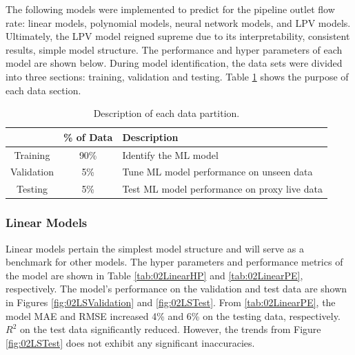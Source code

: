 The following models were implemented to predict for the pipeline outlet flow rate: linear models, polynomial models, neural network models, and LPV models.  Ultimately, the LPV model reigned supreme due to its interpretability, consistent results, simple model structure. The performance and hyper parameters of each model are shown below.  During model identification, the data sets were divided into three sections: training, validation and testing.  Table \ref{tab:02datapart} shows the purpose of each data section.
\begin{table}[h]
    \centering
    {
    \begin{tabular}{ c | c | p{9cm}}
                            & \% of Data        &  Description \\
        \hline
        Training            &  90\%             
        &  Identify the ML model        \\
        
        Validation          &  5\%              
        &  Tune ML model performance on unseen data         \\
        
        Testing             &  5\%             
        &  Test ML model performance on proxy live data       \\             
    \end{tabular}}
    \caption{Description of each data partition.}
    \label{tab:02datapart}
\end{table}

\subsubsection{Linear Models}
Linear models pertain the simplest model structure and will serve as a benchmark for other models.  The hyper parameters and performance metrics of the model are shown in Table \ref{tab:02LinearHP} and \ref{tab:02LinearPE}, respectively. The model's performance on the validation and test data are shown in Figures \ref{fig:02LSValidation} and \ref{fig:02LSTest}. From \ref{tab:02LinearPE}, the model MAE and RMSE increased 4\% and 6\% on the testing data, respectively.  $R^2$ on the test data significantly reduced.  However, the trends from Figure \ref{fig:02LSTest} does not exhibit any significant inaccuracies. 

